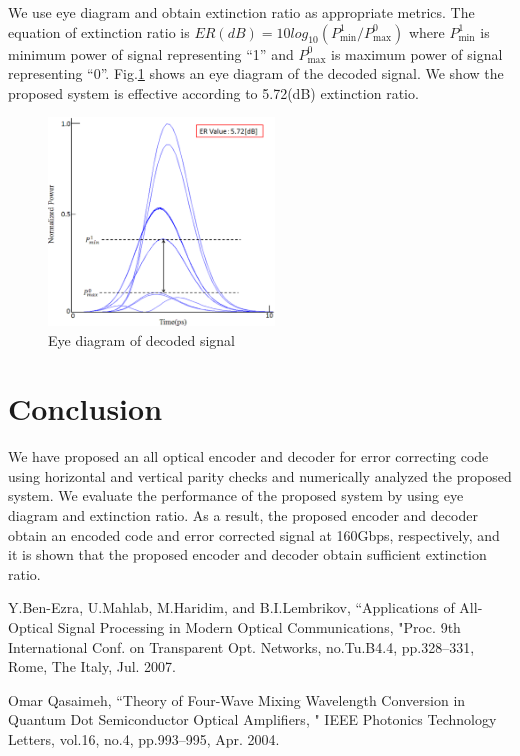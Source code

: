 \documentclass[twocolumn,a4paper]{article}
\begin{document}
{We use eye diagram and obtain extinction ratio as appropriate metrics. The equation of extinction ratio is $ER(dB)=10log_{10}(P^{1}_{\min}/P^{0}_{\max})$ where $P^{1}_{\min}$ is minimum power of signal representing ``1'' and $P^{0}_{\max}$ is maximum power of signal representing ``0''. Fig.{\ref{figure:eyedia}} shows an eye diagram of the decoded signal. We show the proposed system is effective according to 5.72(dB) extinction ratio{\cite{Gayen}}.

\begin{figure}[htbp]
\begin{center}
  \includegraphics[width=60mm]{eyedia.eps}
  \caption{Eye diagram of decoded signal}
  \label{figure:eyedia}
\end{center}
\end{figure}

\section{Conclusion}
We have proposed an all optical encoder and decoder for error correcting code using horizontal and vertical parity checks and numerically analyzed the proposed system. We evaluate the performance of the proposed system by using eye diagram and extinction ratio. As a result, the proposed encoder and decoder obtain an encoded code and error corrected signal at 160Gbps, respectively, and it is shown that the proposed encoder and decoder obtain sufficient extinction ratio.

\begin{thebibliography}{9}
Y.Ben-Ezra, U.Mahlab, M.Haridim, and B.I.Lembrikov, ``Applications of All-Optical Signal Processing in Modern Optical Communications, "Proc. 9th International Conf. on Transparent Opt. Networks, no.Tu.B4.4, pp.328--331, Rome, The Italy, Jul. 2007.

Omar Qasaimeh, ``Theory of Four-Wave Mixing Wavelength Conversion in Quantum Dot Semiconductor Optical Amplifiers, " IEEE Photonics Technology Letters, vol.16, no.4, pp.993--995, Apr. 2004.


\end{thebibliography}}
\end{document}
